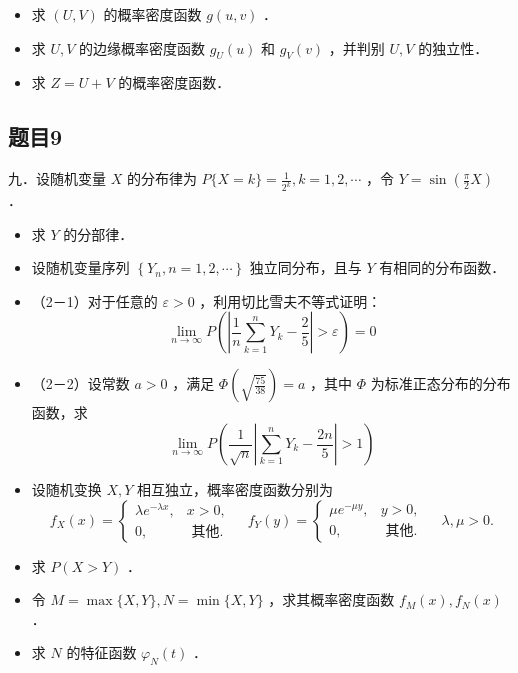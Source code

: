 \documentclass{article}
\begin{document}
\begin{itemize}
  \item[（1）] 求 \((U, V)\) 的概率密度函数 \(g(u, v)\) ．
  \item[（2）] 求 \(U, V\) 的边缘概率密度函数 \(g_{U}(u)\) 和 \(g_{V}(v)\) ，并判别 \(U, V\) 的独立性．
  \item[（3）] 求 \(Z=U+V\) 的概率密度函数．
\end{itemize}

\subsection{题目9}
九．设随机变量 \(X\) 的分布律为 \(P\{X=k\}=\frac{1}{2^{k}}, k=1,2, \cdots\) ，令 \(Y=\sin \left(\frac{\pi}{2} X\right)\) ．

\begin{itemize}
  \item[（1）] 求 \(Y\) 的分部律．
  \item[（2）] 设随机变量序列 \(\left\{Y_{n}, n=1,2, \cdots\right\}\) 独立同分布，且与 \(Y\) 有相同的分布函数．
  \item[] （2－1）对于任意的 \(\varepsilon>0\) ，利用切比雪夫不等式证明：
\[
\lim _{n \rightarrow \infty} P\left(\left|\frac{1}{n} \sum_{k=1}^{n} Y_{k}-\frac{2}{5}\right|>\varepsilon\right)=0
\]
  \item[] （2－2）设常数 \(a>0\) ，满足 \(\Phi\left(\sqrt{\frac{75}{38}}\right)=a\) ，其中 \(\Phi\) 为标准正态分布的分布函数，求
\[
\lim _{n \rightarrow \infty} P\left(\frac{1}{\sqrt{n}}\left|\sum_{k=1}^{n} Y_{k}-\frac{2 n}{5}\right|>1\right)
\]
  \item[十．] 设随机变换 \(X, Y\) 相互独立，概率密度函数分别为
\[
f_{X}(x)=\left\{\begin{array}{ll}
\lambda e^{-\lambda x}, & x>0, \\
0, & \text { 其他. }
\end{array} \quad f_{Y}(y)=\left\{\begin{array}{ll}
\mu e^{-\mu y}, & y>0, \\
0, & \text { 其他. }
\end{array} \quad \lambda, \mu>0 .\right.\right.
\]
  \item[（1）] 求 \(P(X>Y)\) ．
  \item[（2）] 令 \(M=\max \{X, Y\}, N=\min \{X, Y\}\) ，求其概率密度函数 \(f_{M}(x), f_{N}(x)\) ．
  \item[（3）] 求 \(N\) 的特征函数 \(\varphi_{N}(t)\) ．
\end{itemize}
\end{document}
